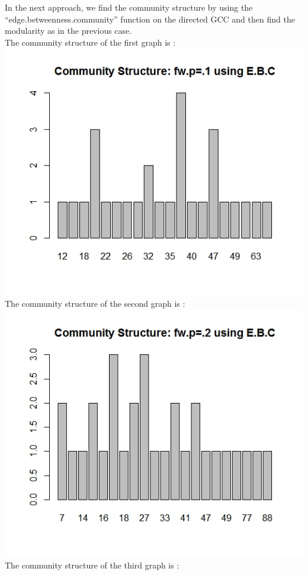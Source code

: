 \documentclass{article}
\begin{document}
In the next approach, we find the community structure by using the ``edge.betweenness.community'' function on the directed 
GCC and then find the modularity as in the previous case.\\
The community structure of the first graph is :\\
\includegraphics[scale=0.4]{pd4} \\
The community structure of the second graph is :\\
\includegraphics[scale=0.4]{pd9} \\
The community structure of the third graph is :\\
\end{document}
